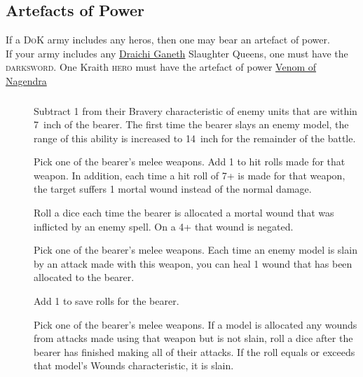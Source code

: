 \hypertarget{artefacts-of-power}{%
    \subsection{Artefacts of Power}\label{artefacts-of-power}}
If a \textsc{DoK} army includes any heros, then one may bear an
artefact of power.\\
If your army includes any \hyperref[draichi-ganeth]{Draichi Ganeth} Slaughter
Queens, one must have the \textsc{darksword}.
One Kraith \textsc{hero} must have the artefact of power
\hyperref[venom-of-nagendra]{Venom of Nagendra}

\subsubsection{{}}
\begin{description} 
    \item [] Subtract 1 from their Bravery
        characteristic of enemy units that are within 7~inch of the bearer. The
        first time the bearer slays an enemy model, the range of this ability
        is increased to 14~inch for the remainder of the battle.
    \item [] Pick one of the bearer’s melee
        weapons. Add 1 to hit rolls made for that weapon. In addition, each
        time a hit roll of 7+ is made for that weapon, the target suffers
        1 mortal wound instead of the normal damage.
    \item [] Roll a dice each
        time the bearer is allocated a mortal wound that was inflicted by an
        enemy spell. On a 4+ that wound is negated.
    \item [] Pick one of the bearer’s melee
        weapons. Each time an enemy model is slain by an attack made with this
        weapon, you can heal 1 wound that has been allocated to the bearer.
    \item [] Add 1 to save rolls for the bearer.
    \item [] Pick one of the bearer’s
        melee weapons. If a model is allocated any wounds from attacks made
        using that weapon but is not slain, roll a dice after the bearer has
        finished making all of their attacks. If the roll equals or exceeds
        that model’s Wounds characteristic, it is slain.
\end{description} 

